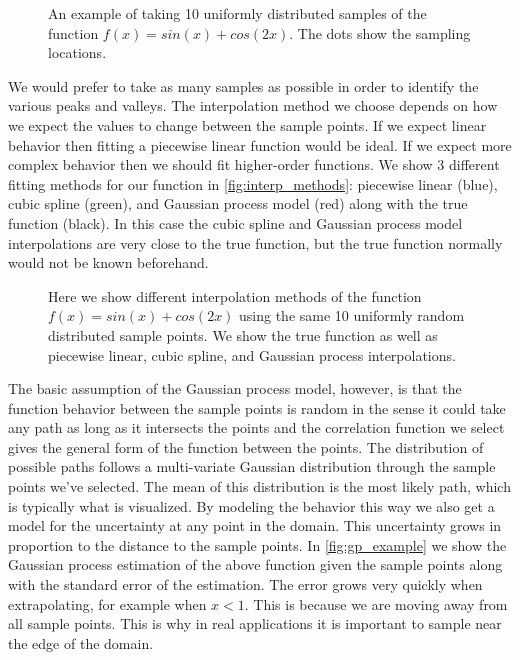 \begin{figure}[htb]
  \centering
  
  \caption{
    An example of taking 10 uniformly distributed samples of the function
    $f(x) = sin(x) + cos(2x)$.  The dots show the sampling locations.
  }
  \label{fig:reconstruction_sampling}
\end{figure}

We would prefer to take as many samples as possible in order to identify
the various peaks and valleys.
The interpolation method we choose depends on how we expect the values to
change between the sample points.
If we expect linear behavior then fitting a
piecewise linear function would be ideal.  If we expect more complex behavior
then we should fit higher-order functions.  We show 3 different fitting 
methods for our function in \autoref{fig:interp_methods}: piecewise linear (blue), 
cubic spline (green), and Gaussian process model (red) along with the true
function (black).  In this case the cubic spline and Gaussian process model
interpolations are very close to the true function, but the true function
normally would not be known beforehand.

\begin{figure}[htb]
  \centering
  
  \caption{
    Here we show different interpolation methods of the function
    $f(x) = sin(x) + cos(2x)$ using the same 10 uniformly random distributed
    sample points.  We show the true function as well as piecewise linear,
    cubic spline, and Gaussian process interpolations.
  }
  \label{fig:interp_methods}
\end{figure}

The basic assumption of the Gaussian process model, however, is that the
function behavior between the sample points is random in the sense it could
take any path as long as it intersects the points and the correlation function
we select gives the general form of the function between the points.
The distribution of possible paths follows a multi-variate Gaussian
distribution through the sample points we've selected.  The mean of this 
distribution is the most likely path, which is typically what is visualized.
By modeling the behavior this way we also get a model for the uncertainty
at any point in the domain.  This uncertainty grows in proportion to the
distance to the sample points.  In \autoref{fig:gp_example} we show the Gaussian
process estimation of the above function given the sample points along with
the standard error of the estimation.  The error grows very quickly when
extrapolating, for example when $x < 1$.  This is 
because we are moving away from all sample points.  This is why in real 
applications it is important to sample near the edge of the domain.

